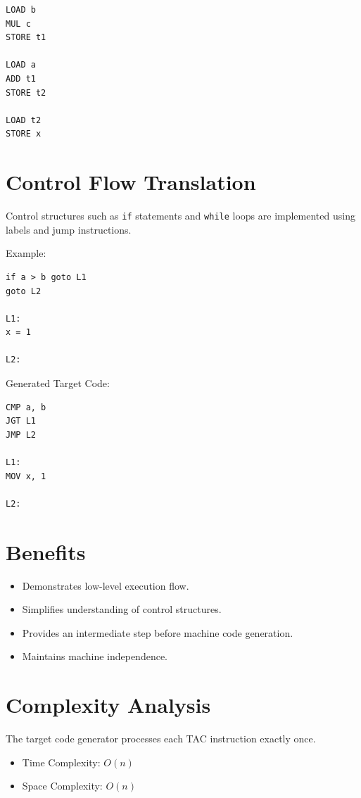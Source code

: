 \documentclass[12pt,a4paper]{report}
\begin{document}
\begin{lstlisting}
LOAD b
MUL c
STORE t1

LOAD a
ADD t1
STORE t2

LOAD t2
STORE x
\end{lstlisting}

\section{Control Flow Translation}

Control structures such as \texttt{if} statements and \texttt{while} loops are implemented using labels and jump instructions.

Example:

\begin{lstlisting}
if a > b goto L1
goto L2

L1:
x = 1

L2:
\end{lstlisting}

Generated Target Code:

\begin{lstlisting}
CMP a, b
JGT L1
JMP L2

L1:
MOV x, 1

L2:
\end{lstlisting}

\section{Benefits}

\begin{itemize}
    \item Demonstrates low-level execution flow.
    \item Simplifies understanding of control structures.
    \item Provides an intermediate step before machine code generation.
    \item Maintains machine independence.
\end{itemize}

\section{Complexity Analysis}

The target code generator processes each TAC instruction exactly once.

\begin{itemize}
    \item Time Complexity: \(O(n)\)
    \item Space Complexity: \(O(n)\)
\end{itemize}
\end{document}
